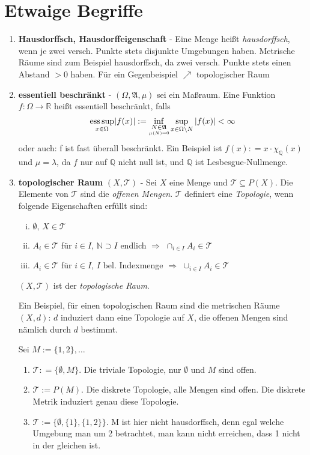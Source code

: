 \documentclass[ngerman]{report}
\theoremstyle{plain}%
\theoremstyle{definition}%
\theoremstyle{myStyle}
\newcommand{\R}{\mathbb{R}}
\newcommand{\Q}{\mathbb{Q}}
\newcommand{\N}{\mathbb{N}}
\newcommand{\hA}{\mathfrak{A}}%
\newcommand{\tT}{\mathcal{T}} %
\newcommand{\ess}{\textnormal{ess}}
\newcommand{\df}[1][]{%
	\overset{#1}{\Rightarrow}
}
\begin{document}
\section*{Etwaige Begriffe}
	\begin{enumerate}
		\item \textbf{Hausdorffsch, Hausdorffeigenschaft} - Eine Menge heißt \textit{hausdorffsch}, wenn je zwei versch. Punkte stets disjunkte Umgebungen haben. Metrische Räume sind zum Beispiel hausdorffsch, da zwei versch. Punkte stets einen Abstand $> 0$ haben. Für ein Gegenbeispiel $\nearrow$ topologischer Raum

		\item \textbf{essentiell beschränkt} - 
					$(\Omega, \hA,\mu)$ sei ein Maßraum. Eine Funktion $f: \Omega \rightarrow \R$ heißt essentiell beschränkt, falls 
					$$\underset{x\in\Omega}{\ess \sup} |f(x)| := {\inf_{\underset{\mu(N)=0}{N \in \hA}} }  
					\sup_{x\in \Omega\backslash N} |f(x)| < \infty$$
					oder auch: f ist fast überall beschränkt. 
					Ein Beispiel ist $f(x) : = x\cdot \chi_\Q(x)$ und $\mu = \lambda$, da $f$ nur auf $\Q$ nicht null ist, und $\Q$ ist Lesbesgue-Nullmenge. 

		\item \textbf{topologischer Raum} $(X,\tT)$ - Sei $X$ eine Menge und $\tT\subseteq P(X)$. Die Elemente von $\tT$ sind die \textit{offenen Mengen}. $\tT$ definiert eine \textit{Topologie}, wenn folgende Eigenschaften erfüllt sind:
	\begin{enumerate}[(i)]
	\item $\emptyset,\,X\in \tT$

\item $A_i\in\tT$ für $i\in I$, $\N \supset I$ endlich $\df$ $\cap_{i\in I} A_i\in\tT$

\item $A_i\in\tT$ für $i\in I$, $I$ bel. Indexmenge $\df$ $\cup_{i\in I}A_i \in \tT$
\end{enumerate}
	$(X,\tT)$ ist der \textit{topologische Raum}.\par
Ein Beispiel, für einen topologischen Raum sind die metrischen Räume $(X,d)$: $d$ induziert dann eine Topologie auf $X$, die offenen Mengen sind nämlich durch $d$ bestimmt.\par
Sei $M:=\{1,2\},\dots$
\begin{enumerate}[]
\item $\tT: = \{\emptyset,M\}$. Die triviale Topologie, nur $\emptyset$ und $M$ sind offen.

\item $\tT:=P(M)$. Die diskrete Topologie, alle Mengen sind offen. Die diskrete Metrik induziert genau diese Topologie.

\item $\tT:=\{\emptyset,\{1\},\{1,2\}\}.$ M ist hier nicht hausdorffsch, denn egal welche Umgebung man um 2 betrachtet, man kann nicht erreichen, dass 1 nicht in der gleichen ist.
\end{enumerate}
			
	\end{enumerate} 
 
\end{document}
